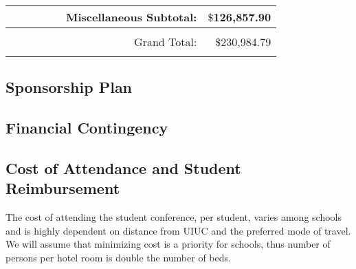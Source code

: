 \begin{tabular}{clcrccccr}
     &                           &                           &                           &                           &\multicolumn{3}{r}{Miscellaneous Subtotal:}                                       & $\$$126,857.90           \\ \hline\hline
     &                           &                           &                           &                           &                          &                           &                           &                          \\
     &                           &                           &                           &                           &\multicolumn{3}{r}{Grand Total:}                                                  & $\$$230,984.79           \\
     &                           &                           &                           &                           &                          &                           &                           &                          \\ \hline\hline
  \end{tabular}
\subsection{Sponsorship Plan}



\subsection{Financial Contingency}

\subsection{Cost of Attendance and Student Reimbursement}
The cost of attending the student conference, per student, varies among schools and is highly dependent on distance from UIUC and the preferred mode of travel. We will assume that minimizing cost is a priority for schools, thus number of persons per hotel room is double the number of beds. 

